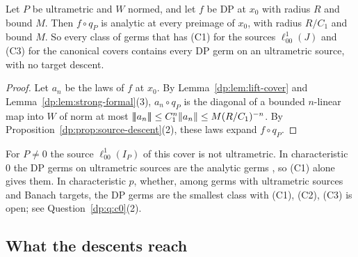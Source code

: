 \begin{corollary}\label{dp:cor:um-cover}
Let $P$ be ultrametric and $W$ normed, and let $f$ be DP at $x_0$ with radius $R$ and bound $M$. Then $f\circ q_P$ is analytic at every preimage of $x_0$, with radius $R/C_1$ and bound $M$. So every class of germs that has (C1) for the sources $\ell^1_{00}(J)$ and (C3) for the canonical covers contains every DP germ on an ultrametric source, with no target descent.
\end{corollary}

\begin{proof}
Let $a_n$ be the laws of $f$ at $x_0$. By Lemma~\ref{dp:lem:lift-cover} and Lemma~\ref{dp:lem:strong-formal}(3), $a_n\circ q_P$ is the diagonal of a bounded $n$-linear map into $W$ of norm at most $\lvert\!\lvert\!\lvert a_n\rvert\!\rvert\!\rvert\le C_1^n\lVert a_n\rVert\le M(R/C_1)^{-n}$. By Proposition~\ref{dp:prop:source-descent}(2), these laws expand $f\circ q_P$.
\end{proof}

For $P\ne0$ the source $\ell^1_{00}(I_P)$ of this cover is not ultrametric. In characteristic $0$ the DP germs on ultrametric sources are the analytic germs \cite[Proposition~14.40(2)]{I}, so (C1) alone gives them. In characteristic $p$, whether, among germs with ultrametric sources and Banach targets, the DP germs are the smallest class with (C1), (C2), (C3) is open; see Question~\ref{dp:q:c0}(2).

\subsection{What the descents reach}\label{dp:ssec:reach}

